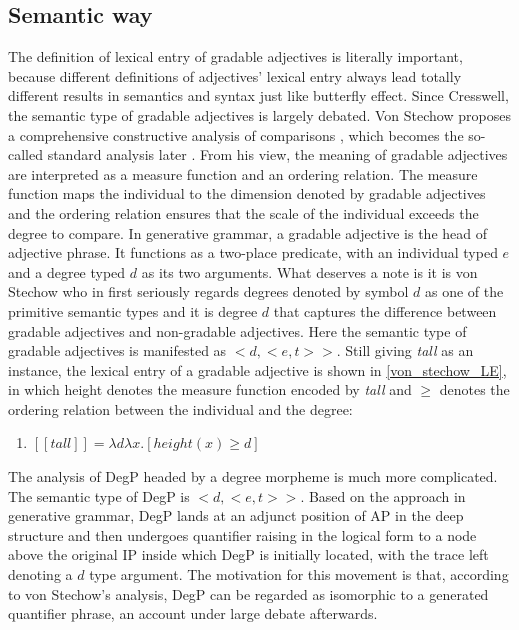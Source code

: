 \documentclass{ctexart}
\let \cite \parencite
\begin{document}
\subsection{Semantic way}

\noindent
The definition of lexical entry of gradable adjectives is literally important, because different definitions of adjectives' lexical entry always lead totally different results in semantics and syntax just like butterfly effect. Since Cresswell, the semantic type of gradable adjectives is largely debated. Von Stechow proposes a comprehensive constructive analysis of comparisons \cite{von1984a}, which becomes the so-called standard analysis later \cite{bale2011}. From his view, the meaning of gradable adjectives are interpreted as a measure function and an ordering relation. The measure function maps the individual to the dimension denoted by gradable adjectives and the ordering relation ensures that the scale of the individual exceeds the degree to compare. In generative grammar, a gradable adjective is the head of adjective phrase. It functions as a two-place predicate, with an individual typed $e$ and a degree typed $d$ as its two arguments. What deserves a note is it is von Stechow who in first seriously regards degrees denoted by symbol $d$ as one of the primitive semantic types and it is degree $d$ that captures the difference between gradable adjectives and non-gradable adjectives. Here the semantic type of gradable adjectives is manifested as $<d,<e,t>>$. Still giving \textit{tall} as an instance, the lexical entry of a gradable adjective is shown in \ref{von_stechow_LE}, in which height denotes the measure function encoded by \textit{tall} and $\geq$ denotes the ordering relation between the individual and the degree:

\begin{enumerate}
    \item \label{von_stechow_LE} $[\![tall]\!] = \lambda d \lambda x. [height(x) \geq d]$
\end{enumerate}

The analysis of DegP headed by a degree morpheme is much more complicated. The semantic type of DegP is $<d,<e,t>>$. Based on the approach in generative grammar, DegP lands at an adjunct position of AP in the deep structure and then undergoes quantifier raising in the logical form to a node above the original IP inside which DegP is initially located, with the trace left denoting a $d$ type argument. The motivation for this movement is that, according to von Stechow's analysis, DegP can be regarded as isomorphic to a generated quantifier phrase, an account under large debate afterwards.
\end{document}
